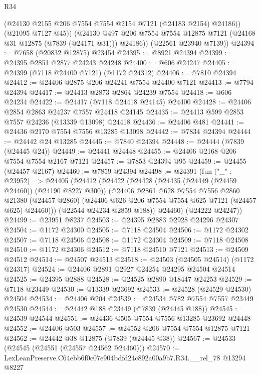 \begin{lexlean}{R34}
\begin{coremodule}
            (@24130 @2155 @206 @7554 @7554 @2154 @7121 (@24183 @2154) @24186))
          (@21095 @7127 @45))
        (@24130 @497 @206 @7554 @7554 @12875 @7121 (@24168 @31 @12875 (@7839 (@24171 @31))) @24186))
      (@22561 @23940 @7139))
@24394 := @7658 (@20832 @12875) @23454
@24395 := @8921 @24394
@24399 := @24395 @2851 @2877 @24243 @24248
@24400 := @606 @24247
@24405 := @24399 (@7118 @24400 @7121) (@1172 @24312)
@24406 := @7810 @24394
@24412 := @24406 @2875 @206 @24241 @7554 @24400 @7121
@24413 := @7794 @24394
@24417 := @24413 @2873 @2864 @24239 @7554
@24418 := @606 @24234
@24422 := @24417 (@7118 @24418 @24145) @24400
@24428 := @24406 @2854 @2863 @24237 @7557 @24418 @24145
@24435 := @24413 @599 @2853 @7557 @24236 (@13339 @13098) @24418
@24436 := @24406 @481
@24441 := @24436 @2170 @7554 @7556 @13285 @13098
@24442 := @7834 @24394
@24444 := @24442 @24 @13285
@24445 := @7840 @24394
@24448 := @24444 (@7839 (@24445 @24))
@24449 := @24441 @24448
@24455 := @24406 @2168 @206 @7554 @7554 @2167 @7121
@24457 := @7853 @24394 @95
@24459 := @24455 (@24457 @2167)
@24460 := @7859 @24394
@24498 := @24391
    (fun ("_" : @23952) =>
    @24405
      (@24412
        (@24422
          (@24428
            (@24435 (@24449 (@24459 @24460)) (@24190 @8227 @300))
            (@24406
              @2861
              @628
              @7554
              @7556
              @2860
              @21380
              (@24457 @2860)
              (@24406 @626 @206 @7554 @7554 @625 @7121 (@24457 @625) @24460)))
          (@22544 @24234 @2859 @188))
        @24460)
      (@24222 @24247))
@24499 := @23951 @8237
@24503 := @24395 @2883 @2928 @24296 @24307
@24504 := @1172 @24300
@24505 := @7118 @24504
@24506 := @1172 @24302
@24507 := @7118 @24506
@24508 := @1172 @24304
@24509 := @7118 @24508
@24510 := @1172 @24306
@24512 := @7118 @24510 @7121
@24513 := @24509 @24512
@24514 := @24507 @24513
@24518 := @24503 (@24505 @24514) (@1172 @24317)
@24524 := @24406 @2891 @2927 @24254 @24295 @24504 @24514
@24525 := @24395 @2888
@24528 := @24525 @2890 @18447 @24253
@24529 := @7118 @23449
@24530 := @13339 @23692
@24533 := @24528 (@24529 @24530) @24504
@24534 := @24406 @204
@24539 := @24534 @782 @7554 @7557 @23449 @24530
@24544 := @24442 @188 @23449 (@7839 (@24445 @188))
@24545 := @24539 @24544
@24551 := @24436 @505 @7554 @7556 @13285 @23692 @24448
@24552 := @24406 @503
@24557 := @24552 @206 @7554 @7554 @12875 @7121
@24562 := @24442 @38 @12875 (@7839 (@24445 @38))
@24567 := @24533 (@24545 (@24551 (@24557 @24562 @24460)))
@24570 := LexLeanPreserve.C64ebb6f0c07e904bdfd24c892a00a9b7.R34.__rel_78 @13294 @8227

\end{coremodule}
\end{lexlean}
